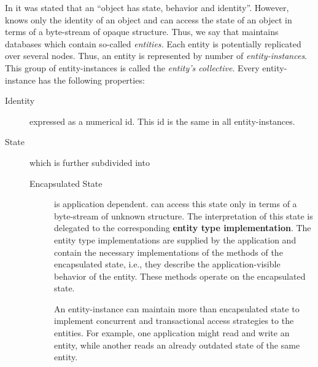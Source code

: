 \documentclass[a4paper, 10pt]{book}
\begin{document}
                In \cite{booch91} it was stated that an ``object has state, behavior
                and identity''. However, \SYNEIGHT knows only the identity of an object
                and can access the state of an object in terms of a byte-stream of
                opaque structure. 
                Thus, we say that \SYNEIGHT maintains databases which contain so-called
                \emph{entities.}
                Each entity is potentially replicated over several nodes. Thus, an
                entity is represented by number of \emph{entity-instances}. This group
                of entity-instances is called the \emph{entity's collective}. Every
                entity-instance has the following properties:
                \begin{description}
                    \item[Identity] expressed as a numerical id. This id is the same in
                        all entity-instances. 
                    \item[State] which is further subdivided into
                        \begin{description}
                            \item[Encapsulated State] is application dependent. \SYNEIGHT can
                                access this state only in terms of a byte-stream of unknown
                                structure. The interpretation of this state is delegated to
                                the corresponding \textbf{entity type implementation}. The entity
                                type implementations are supplied by the application and contain
                                the necessary implementations of the methods of the encapsulated
                                state, i.e., they describe the application-visible behavior of the
                                entity. These methods operate on the encapsulated state.

                                An entity-instance can maintain more than encapsulated state to
                                implement concurrent and transactional access strategies to the
                                entities. 
                                For example, one application might read and write an entity, while
                                another reads an already outdated state of the same entity.


\end{description}
\end{description}
\end{document}
